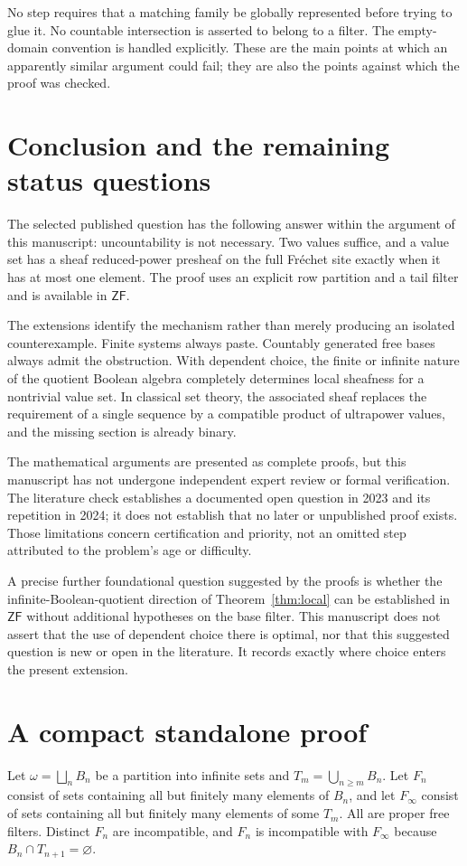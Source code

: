 \documentclass[11pt,letterpaper]{article}
\theoremstyle{definition}
\theoremstyle{remark}
\newcommand{\om}{\omega}
\newcommand{\ZF}{\mathsf{ZF}}
\begin{document}
No step requires that a matching family be globally represented before
trying to glue it. No countable intersection is asserted to belong to
a filter. The empty-domain convention is handled explicitly. These are
the main points at which an apparently similar argument could fail;
they are also the points against which the proof was checked.

\section{Conclusion and the remaining status questions}
\label{sec:conclusion}

The selected published question has the following answer within the
argument of this manuscript: uncountability is not necessary. Two values
suffice, and a value set has a sheaf reduced-power presheaf on the full
Fr\'echet site exactly when it has at most one element. The proof uses an
explicit row partition and a tail filter and is available in $\ZF$.

The extensions identify the mechanism rather than merely producing an
isolated counterexample. Finite systems always paste. Countably generated
free bases always admit the obstruction. With dependent choice, the
finite or infinite nature of the quotient Boolean algebra completely
determines local sheafness for a nontrivial value set. In classical set
theory, the associated sheaf replaces the requirement of a single
sequence by a compatible product of ultrapower values, and the missing
section is already binary.

The mathematical arguments are presented as complete proofs, but this
manuscript has not undergone independent expert review or formal
verification. The literature check establishes a documented open
question in 2023 and its repetition in 2024; it does not establish that
no later or unpublished proof exists. Those limitations concern
certification and priority, not an omitted step attributed to the
problem's age or difficulty.

A precise further foundational question suggested by the proofs is
whether the infinite-Boolean-quotient direction of
Theorem~\ref{thm:local} can be established in $\ZF$ without additional
hypotheses on the base filter. This manuscript does not assert that the
use of dependent choice there is optimal, nor that this suggested
question is new or open in the literature. It records exactly where
choice enters the present extension.

\appendix
\section{A compact standalone proof}
\label{app:shortproof}
Let $\om=\bigsqcup_nB_n$ be a partition into infinite sets and
$T_m=\bigcup_{n\geq m}B_n$. Let $F_n$ consist of sets containing
all but finitely many elements of $B_n$, and let $F_\infty$ consist
of sets containing all but finitely many elements of some $T_m$.
All are proper free filters. Distinct $F_n$ are incompatible, and
$F_n$ is incompatible with $F_\infty$ because
$B_n\cap T_{n+1}=\varnothing$.
\end{document}

